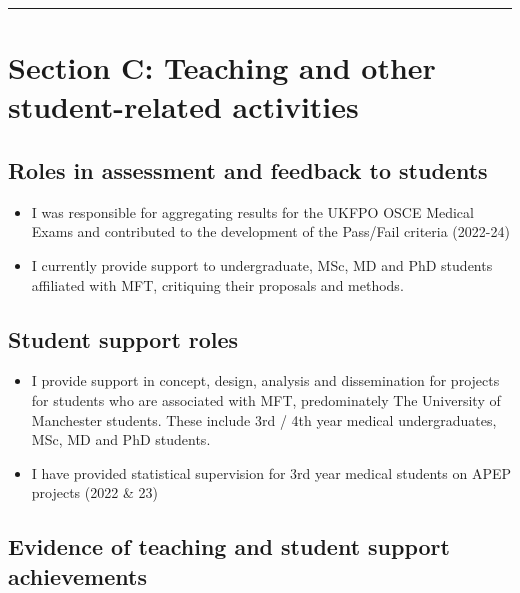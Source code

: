 \documentclass[
]{article}
\providecommand{\tightlist}{%
  \setlength{\itemsep}{0pt}\setlength{\parskip}{0pt}}
\begin{document}
\begin{center}\rule{0.5\linewidth}{0.5pt}\end{center}

\hypertarget{section-c-teaching-and-other-student-related-activities}{%
\section{Section C: Teaching and other student-related
activities}\label{section-c-teaching-and-other-student-related-activities}}

\hypertarget{roles-in-assessment-and-feedback-to-students}{%
\subsection{Roles in assessment and feedback to
students}\label{roles-in-assessment-and-feedback-to-students}}

\begin{itemize}
\tightlist
\item
  I was responsible for aggregating results for the UKFPO OSCE Medical
  Exams and contributed to the development of the Pass/Fail criteria
  (2022-24)
\item
  I currently provide support to undergraduate, MSc, MD and PhD students
  affiliated with MFT, critiquing their proposals and methods.
\end{itemize}

\hypertarget{student-support-roles}{%
\subsection{Student support roles}\label{student-support-roles}}

\begin{itemize}
\tightlist
\item
  I provide support in concept, design, analysis and dissemination for
  projects for students who are associated with MFT, predominately The
  University of Manchester students. These include 3rd / 4th year
  medical undergraduates, MSc, MD and PhD students.
\item
  I have provided statistical supervision for 3rd year medical students
  on APEP projects (2022 \& 23)
\end{itemize}

\hypertarget{evidence-of-teaching-and-student-support-achievements}{%
\subsection{Evidence of teaching and student support
achievements}\label{evidence-of-teaching-and-student-support-achievements}}
\end{document}
